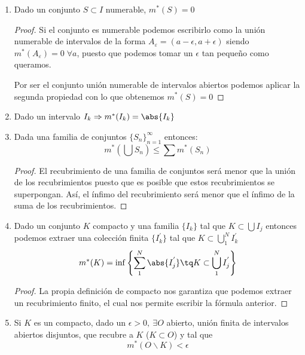 \documentclass{apuntes}
\begin{document}
\begin{enumerate}
\begin{proof}
Por tanto queda claro que no puede ser $m^*(S) < \inf m^*(O)$.
\end{proof}

%
\item Dado un conjunto $S \subset I$ numerable, $m^*(S)=0$
\begin{proof}
Si el conjunto es numerable podemos escribirlo como la unión numerable de intervalos de la forma $A_ε = (a-\epsilon, a +\epsilon)$ siendo $m^*(A_ε)=0\; \forall a$, puesto que podemos tomar un $\epsilon$ tan pequeño como queramos.

Por ser el conjunto unión numerable de intervalos abiertos podemos aplicar la segunda propiedad con lo que obtenemos $m^*(S)=0$
\end{proof}

%
\item Dado un intervalo $I_k \Rightarrow m^*(I_k)=\abs{I_k}$

%
\item Dada una familia de conjuntos $\lbrace S_n\rbrace_{n=1}^{\infty}$  entonces:
\[m^*\left(\bigcup S_n\right) \leq \sum m^*(S_n)\]
\begin{proof}
El recubrimiento de una familia de conjuntos será menor que la unión de los recubrimientos puesto que es posible que estos recubrimientos se superpongan. Así, el ínfimo del recubrimiento será menor que el ínfimo de la suma de los recubrimientos.
\end{proof}


%
\item Dado un conjunto $K$ compacto y una familia $\lbrace I_k \rbrace$ tal que $K \subset \bigcup I_j$ entonces podemos extraer una colección finita $\lbrace I_k^{'} \rbrace$ tal que $K \subset \bigcup_1^N I_k^{'}$
\[m^*(K) = \inf\left\{\sum_1^N \abs{I_j^{'}} \tq K\subset \bigcup_1^N I_j^{'} \right\}\]
\begin{proof}
La propia definición de compacto nos garantiza que podemos extraer un recubrimiento finito, el cual nos permite escribir la fórmula anterior.
\end{proof}

%
\item Si $K$ es un compacto, dado un $\epsilon > 0, \ \exists O$ abierto, unión finita de intervalos abiertos disjuntos, que recubre a $K$ ($K\subset O$) y tal que
\[m^*(O\smallsetminus K) < \epsilon\]


\end{enumerate}
\end{document}
